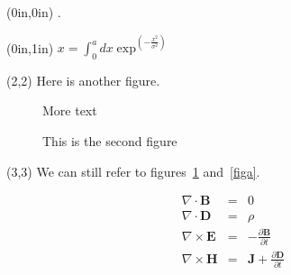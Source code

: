 \documentclass{article}
\begin{document}
\begin{textblock*}{7.5in}(0in,0in)
       .
\end{textblock*}

\begin{textblock*}{5in}(0in,1in)
  $x = \int_{0}^{a} dx \exp^{\left( -\frac{x^2}{\sigma^2} \right)}$
\end{textblock*}

\begin{textblock}{5}(2,2)
  Here is another figure.
  \begin{figure}
  More text
  \caption{\label{figb}This is the second figure}
  \end{figure}
\end{textblock}

\begin{textblock}{5}(3,3)
  We can still refer to figures~\ref{figb} and~\ref{figa}.
\end{textblock}


\begin{eqnarray}
  \nabla \cdot  \mathbf{B} & = &  0 \\
  \nabla \cdot  \mathbf{D} & = & \rho \\
  \nabla \times \mathbf{E} & = & -\frac{ \partial \mathbf{B} }{\partial t} \\
  \nabla \times \mathbf{H} & = & \mathbf{J}  + \frac{\partial \mathbf{D}}{\partial t}
\end{eqnarray}
\end{document}
